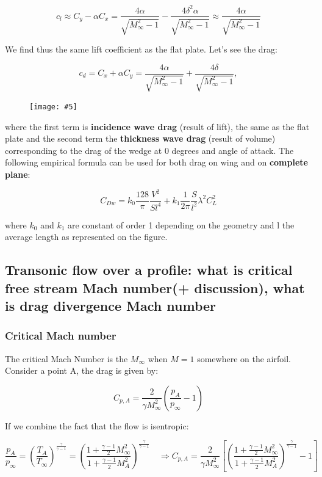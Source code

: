 \documentclass[british,french,11pt, a4paper, openany]{article}
\newcommand{\wrapfig}[6]{%
	\begin{figure}%
		\vspace{-5mm}%
		\texttt{[image: \#5]}%
		\captionof{figure}{}%
		\label{#6}%
	\end{figure}%
}
\begin{document}
\begin{equation}
c_l \approx C_y - \alpha C_x = \frac{4\alpha }{\sqrt{M_\infty ^2 -1}} - \frac{4\delta ^2\alpha }{\sqrt{M_\infty ^2 -1}}  \approx \frac{4\alpha }{\sqrt{M_\infty ^2 -1}} 
\end{equation}

We find thus the same lift coefficient as the flat plate. Let's see the drag: 

\begin{equation}
c_d = C_x + \alpha C_y = \frac{4\alpha }{\sqrt{M_\infty ^2 -1}} + \frac{4\delta}{\sqrt{M_\infty ^2 -1}},
\end{equation}

\wrapfig{11}{l}{3}{0.3}{ch6/20}{fig:6.20}
where the first term is \textbf{incidence wave drag} (result of lift), the same as the flat plate and the second term the \textbf{thickness wave drag} (result of volume) corresponding to the drag of the wedge at 0 degrees and angle of attack. The following empirical formula can be used for both drag on wing and on \textbf{complete plane}: 

\begin{equation}
C_{Dw} = k_0 \frac{128}{\pi} \frac{V^2}{Sl^4} + k_1 \frac{1}{2\pi} \frac{S}{l^2}\lambda ^2 C_L^2
\end{equation}

where $k_0$ and $k_1$ are constant of order 1 depending on the geometry and l the average length as represented on the figure. 

\subsection{Transonic flow over a profile: what is critical free stream Mach number(+ discussion), what is
	drag divergence Mach number}
\subsubsection{Critical Mach number}
The critical Mach Number is the $M_\infty$ when $M = 1$ somewhere on the airfoil. Consider a point A, the drag is given by: 

\begin{equation}
C_{p,A} = \frac{2}{\gamma M_\infty^2} \left( \frac{p_A}{p_\infty} -1 \right)
\end{equation}

If we combine the fact that the flow is isentropic:

\begin{equation}
\frac{p_A}{p_\infty} = \left(\frac{T_A}{T_\infty}\right)^{\frac{\gamma}{\gamma -1}} = \left(\frac{1+\frac{\gamma - 1}{2}M^2_\infty}{1+\frac{\gamma - 1}{2}M^2_A}\right)^{\frac{\gamma}{\gamma -1}} 
\quad \Rightarrow C_{p,A} = \frac{2}{\gamma M_\infty^2} \left[ \left(\frac{1+\frac{\gamma - 1}{2}M^2_\infty}{1+\frac{\gamma - 1}{2}M^2_A}\right)^{\frac{\gamma}{\gamma -1}} -1 \right]
\end{equation}
\end{document}

